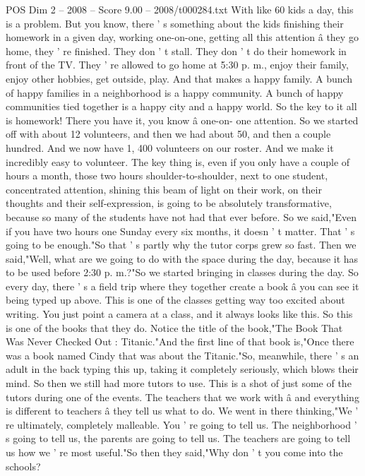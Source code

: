 \begin{textsample}{POS Dim 2 – 2008 – Score 9.00 – 2008/t000284.txt}
With like 60 kids a day, this is a problem.
But you know, there ' s something about the kids finishing their homework in a given day, working one-on-one, getting all this attention â they go home, they ' re finished.
They don ' t stall.
They don ' t do their homework in front of the TV.
They ' re allowed to go home at 5:30 p. m., enjoy their family, enjoy other hobbies, get outside, play.
And that makes a happy family.
A bunch of happy families in a neighborhood is a happy community.
A bunch of happy communities tied together is a happy city and a happy world.
So the key to it all is homework!
There you have it, you know â one-on- one attention.
So we started off with about 12 volunteers, and then we had about 50, and then a couple hundred.
And we now have 1, 400 volunteers on our roster.
And we make it incredibly easy to volunteer.
The key thing is, even if you only have a couple of hours a month, those two hours shoulder-to-shoulder, next to one student, concentrated attention, shining this beam of light on their work, on their thoughts and their self-expression, is going to be absolutely transformative, because so many of the students have not had that ever before.
So we said,"Even if you have two hours one Sunday every six months, it doesn ' t matter.
That ' s going to be enough."So that ' s partly why the tutor corps grew so fast.
Then we said,"Well, what are we going to do with the space during the day, because it has to be used before 2:30 p. m.?"So we started bringing in classes during the day.
So every day, there ' s a field trip where they together create a book â you can see it being typed up above.
This is one of the classes getting way too excited about writing.
You just point a camera at a class, and it always looks like this.
So this is one of the books that they do.
Notice the title of the book,"The Book That Was Never Checked Out : Titanic."And the first line of that book is,"Once there was a book named Cindy that was about the Titanic."So, meanwhile, there ' s an adult in the back typing this up, taking it completely seriously, which blows their mind.
So then we still had more tutors to use.
This is a shot of just some of the tutors during one of the events.
The teachers that we work with â and everything is different to teachers â they tell us what to do.
We went in there thinking,"We ' re ultimately, completely malleable.
You ' re going to tell us.
The neighborhood ' s going to tell us, the parents are going to tell us.
The teachers are going to tell us how we ' re most useful."So then they said,"Why don ' t you come into the schools?

\end{textsample}
